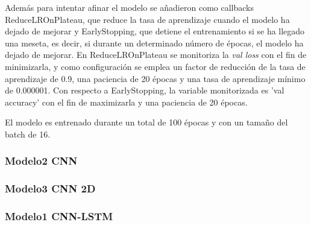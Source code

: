 \documentclass[11pt,a4paper,spanish]{book}
\begin{document}
	Además para intentar afinar el modelo se añadieron como callbacks ReduceLROnPlateau, que reduce la tasa de aprendizaje cuando el modelo ha dejado de mejorar y EarlyStopping, que detiene el entrenamiento si se ha llegado una meseta, es decir, si durante un determinado número de épocas, el modelo ha dejado de mejorar. En ReduceLROnPlateau se monitoriza la \emph{val loss} con el fin de minimizarla, y como configuración se emplea un factor de reducción de la tasa de aprendizaje de 0.9, una paciencia de 20 épocas y una tasa de aprendizaje mínimo de 0.000001.
	Con respecto a EarlyStopping, la variable monitorizada es 'val accuracy' con el fin de maximizarla y una paciencia de 20 épocas.
	
	El modelo es entrenado durante un total de 100 épocas y con un tamaño del batch de 16.
	
	\subsubsection{Modelo2 CNN}
	
	\subsubsection{Modelo3 CNN 2D}
	
	\subsubsection{Modelo1 CNN-LSTM}
	
\end{document}

